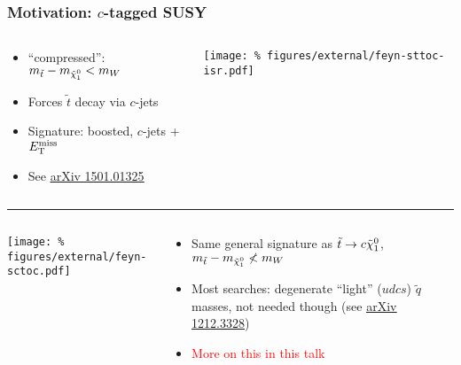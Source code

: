 \documentclass[usenames,dvipsnames]{beamer}
\newcommand{\link}[2]{\underline{\href{#2}{#1}}}
\begin{document}
\begin{frame}
  \frametitle{Motivation: $c$-tagged SUSY}
  \begin{columns}
    \begin{column}{0.6\textwidth}
      \begin{itemize}
      \item ``compressed'': $m_{\tilde{t}} - m_{\tilde{\chi}_1^0} < m_W$
      \item Forces $\tilde{t}$ decay via $c$-jets
      \item Signature: boosted, $c$-jets + $E_{\rm T}^{\rm miss}$
      \item See \link{arXiv 1501.01325}{http://arxiv.org/abs/1501.01325}
      \end{itemize}
    \end{column}
    \begin{column}{0.4\textwidth}
      \texttt{[image: \%
figures/external/feyn-sttoc-isr.pdf]}
    \end{column}
  \end{columns}
  \hrule
  \begin{columns}
    \begin{column}{0.4\textwidth}
      \texttt{[image: \%
figures/external/feyn-sctoc.pdf]}
    \end{column}
    \begin{column}{0.6\textwidth}
      \begin{itemize}
      \item Same general signature as $\tilde{t} \to c \tilde{\chi}_1^0$, $m_{\tilde{t}} - m_{\tilde{\chi}_1^0} \nless m_W$
      \item Most searches: degenerate ``light'' ($udcs$) $\tilde{q}$ masses, not needed though (see \link{arXiv 1212.3328}{http://arxiv.org/abs/1212.3328})
      \item \textcolor{red}{More on this in this talk}
      \end{itemize}
    \end{column}
  \end{columns}
\end{frame}
\end{document}
